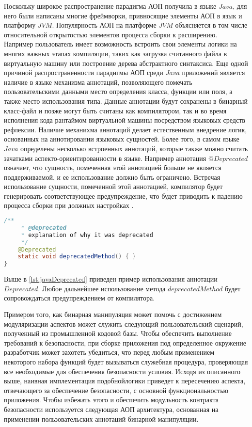 Поскольку широкое распространение парадигма АОП получила в языке $Java$, для него были написаны многие фреймворки, привносящие элементы АОП в язык и платформу $JVM$. Популярность АОП на платформе $JVM$ объясняется в том числе относительной открытостью элементов процесса сборки к расширению. Например пользователь имеет возможность встроить свои элементы логики на многих важных этапах компиляции, таких как загрузка считанного файла в виртуальную машину или построение дерева абстрактного синтаксиса. Еще одной причиной распространенности парадигмы АОП среди $Java$ приложений является наличие в языке механизма аннотаций, позволяющего помечать пользовательскими данными место определения класса, функции или поля, а также место использования типа. Данные аннотации будут сохранены в бинарный класс-файл и позже могут быть считаны как компилятором, так и во время исполнения кода рантаймом виртуальной машины посредством языковых средств рефлексии. Наличие механихма аннотаций делает естественным внедрение логик, основанных на аннотировании языковых сущностей. Более того, в самом языке $Java$ определены несколько встроенных аннотаций, которые также можно считать зачатками аспекто-ориентированности в языке. Например аннотация $@Deprecated$ означает, что сущность, помеченная этой аннотацией больше не является поддерживаемой, и ее использование должно быть ограничено. Встречая использование сущности, помеченной этой аннотацией, компилятор будет генерировать соответствующее предупреждение, что будет приводить к падению процесса сборки при должных настройках \cite{javaAnnotations}.

\begin{lstlisting}[language=Java, caption=Пример использования аннотации $Deprecated$, label=lst:javaDeprecated]
    /**
     * @deprecated
     * explanation of why it was deprecated
     */
    @Deprecated
    static void deprecatedMethod() { }
}
\end{lstlisting}

Выше в \autoref{lst:javaDeprecated} приведен пример использования аннотации $Deprecated$. Любое дальнейшее использование метода $deprecatedMethod$ будет сопровождаться предупреждением от компилятора.

Примером того, как бинарная манипуляция может помочь с достижением модуляризации аспектов может служить следующий пользовательский сценарий, полученный из промышленной кодовой базы. Чтобы обеспечить выполнение требований к безопасности, при сборке приложения под определенное окружение разработчик может захотеть убедиться, что перед любым применением некоторого набора функций будет вызываться служебная процедура, проверяющая все необходимые для обеспечения безопасности условия. Исходя из описанного выше, наивная имплементация подобнойлогики приведет к пересечению аспекта, отвечающего за обеспечение безопасности, с основной функциональностью приложения. Чтобы избежать этого и обеспечить модульность контракта безопасности используется следующая АОП архитектура, основанная на применении пользовательских аннотаций бинарной манипуляции.

